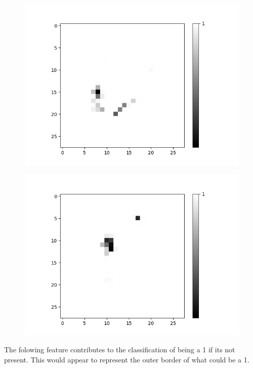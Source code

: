 \begin{figure}[H]
\begin{minipage}[b]{0.19\textwidth}
		\includegraphics[width=\textwidth]{OR-AND(WO-LSM)(1)/Like/False/Layer0-Neuron-10.png}
		\label{}
	\end{minipage}
	\begin{minipage}[b]{0.19\textwidth}
		\includegraphics[width=\textwidth]{OR-AND(WO-LSM)(1)/Like/False/Layer0-Neuron-15.png}
		\label{}
	\end{minipage}
	\hfill
\end{figure}

The folowing feature contributes to the classification of being a 1 if its not present. This would appear to represent the outer border of what could be a 1.

